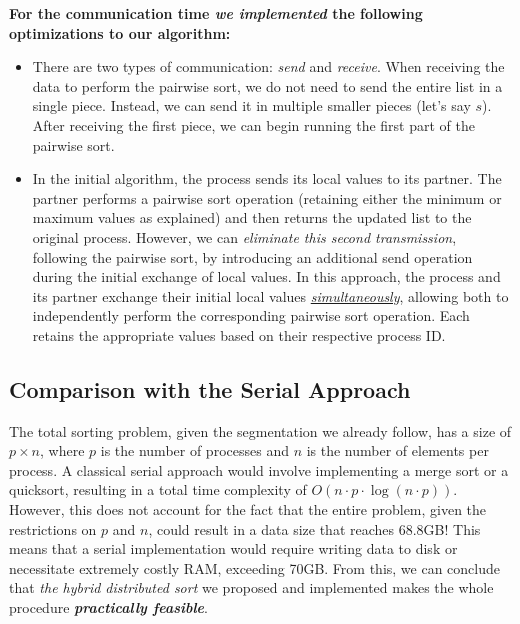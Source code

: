 \documentclass[12pt]{article}
\begin{document}
\textbf{For the communication time \textit{we implemented} the following optimizations to our algorithm:}

\vspace{-15pt}
\begin{itemize}[noitemsep]
    \item There are two types of communication: \textit{send} and \textit{receive}. When receiving the data to perform the pairwise sort, we do not need to send the entire list in a single piece. Instead, we can send it in multiple smaller pieces (let's say \(s\)). After receiving the first piece, we can begin running the first part of the pairwise sort.
    \item In the initial algorithm, the process sends its local values to its partner. The partner performs a pairwise sort operation (retaining either the minimum or maximum values as explained) and then returns the updated list to the original process. However, we can \textit{eliminate this second transmission}, following the pairwise sort, by introducing an additional send operation during the initial exchange of local values. In this approach, the process and its partner exchange their initial local values \underline{\textit{simultaneously}}, allowing both to independently perform the corresponding pairwise sort operation. Each retains the appropriate values based on their respective process ID.

\end{itemize}


\subsection{Comparison with the Serial Approach}
The total sorting problem, given the segmentation we already follow, has a size of \( p \times n \), where \( p \) is the number of processes and \( n \) is the number of elements per process. A classical serial approach would involve implementing a merge sort or a quicksort, resulting in a total time complexity of \( O(n \cdot p \cdot \log(n \cdot p)) \). However, this does not account for the fact that the entire problem, given the restrictions on \( p \) and \( n \), could result in a data size that reaches 68.8GB! This means that a serial implementation would require writing data to disk or necessitate extremely costly RAM, exceeding 70GB. From this, we can conclude that \textit{the hybrid distributed sort} we proposed and implemented makes the whole procedure \textit{\textbf{practically feasible}}. \\
\end{document}
